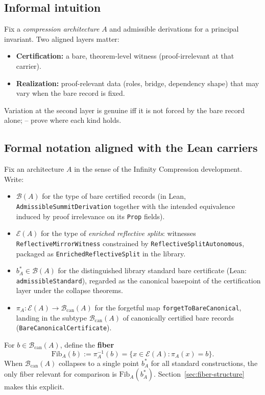\documentclass[11pt]{article}
\begin{document}
\subsection{Informal intuition}\label{sec:framework-intuition}
Fix a \emph{compression architecture} $A$ and admissible derivations for a principal invariant. Two aligned layers matter:
\begin{itemize}
    \item \textbf{Certification:} a bare, theorem-level witness (proof-irrelevant at that carrier).
    \item \textbf{Realization:} proof-relevant data (roles, bridge, dependency shape) that may vary when the bare record is fixed.
\end{itemize}
Variation at the second layer is genuine iff it is not forced by the bare record alone; -- prove where each kind holds.

\subsection{Formal notation aligned with the Lean carriers}\label{sec:framework-notation}
Fix an architecture $A$ in the sense of the Infinity Compression development. Write:
\begin{itemize}
    \item $\mathcal{B}(A)$ for the type of bare certified records (in Lean, \texttt{AdmissibleSummitDerivation} together with the intended equivalence induced by proof irrelevance on its \texttt{Prop} fields).
    \item $\mathcal{E}(A)$ for the type of \emph{enriched reflective splits}: witnesses \texttt{ReflectiveMirrorWitness} constrained by \texttt{ReflectiveSplitAutonomous}, packaged as \texttt{EnrichedReflectiveSplit} in the library.
    \item $b^\ast_A \in \mathcal{B}(A)$ for the distinguished library standard bare certificate (Lean: \texttt{admissibleStandard}), regarded as the canonical basepoint of the certification layer under the collapse theorems.
    \item $\pi_A : \mathcal{E}(A) \to \mathcal{B}_{\mathrm{can}}(A)$ for the forgetful map \texttt{forgetToBareCanonical}, landing in the subtype $\mathcal{B}_{\mathrm{can}}(A)$ of canonically certified bare records (\texttt{BareCanonicalCertificate}).
\end{itemize}
For $b \in \mathcal{B}_{\mathrm{can}}(A)$, define the \textbf{fiber}
\[
  \mathrm{Fib}_A(b) := \pi_A^{-1}(b) = \{ x \in \mathcal{E}(A) : \pi_A(x) = b \}.
\]
When $\mathcal{B}_{\mathrm{can}}(A)$ collapses to a single point $b^\ast_A$ for all standard constructions, the only fiber relevant for comparison is $\mathrm{Fib}_A(b^\ast_A)$. Section~\ref{sec:fiber-structure} makes this explicit.
\end{document}
